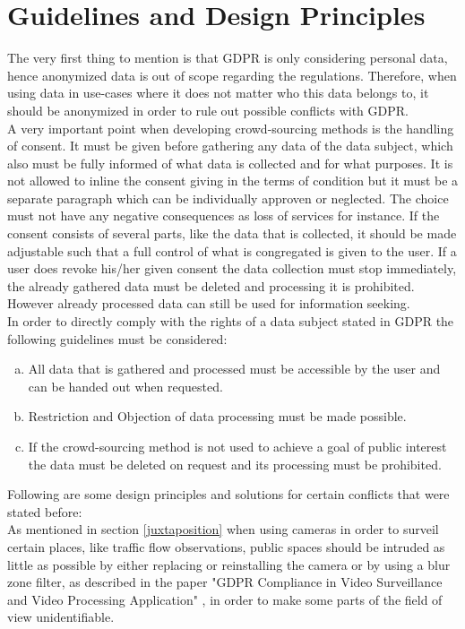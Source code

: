 \documentclass[a4paper,12pt]{report}
\begin{document}
	\section{Guidelines and Design Principles}
	\startsection
		The very first thing to mention is that GDPR is only considering personal data, hence anonymized data is out of scope regarding the regulations. Therefore, when using data in use-cases where it does not matter who this data belongs to, it should be anonymized in order to rule out possible conflicts with GDPR. \\
		A very important point when developing crowd-sourcing methods is the handling of consent. It must be given before gathering any data of the data subject, which also must be fully informed of what data is collected and for what purposes. It is not allowed to inline the consent giving in the terms of condition but it must be a separate paragraph which can be individually approven or neglected. The choice must not have any negative consequences as loss of services for instance. If the consent consists of several parts, like the data that is collected, it should be made adjustable such that a full control of what is congregated is given to the user. If a user does revoke his/her given consent the data collection must stop immediately, the already gathered data must be deleted and processing it is prohibited. However already processed data can still be used for information seeking. \\
		In order to directly comply with the rights of a data subject stated in GDPR the following guidelines must be considered:
		\begin{enumerate}[(a)]
			\item All data that is gathered and processed must be accessible by the user and can be handed out when requested.
			\item Restriction and Objection of data processing must be made possible.
			\item If the crowd-sourcing method is not used to achieve a goal of public interest the data must be deleted on request and its processing must be prohibited.
		\end{enumerate}
		Following are some design principles and solutions for certain conflicts that were stated before: \\	
		As mentioned in section \ref{juxtaposition} when using cameras in order to surveil certain places, like traffic flow observations, public spaces should be intruded as little as possible by either replacing or reinstalling the camera or by using a blur zone filter, as described in the paper "GDPR Compliance in Video Surveillance and Video Processing Application" \cite{GDPRandSurveillanceCameras}, in order to make some parts of the field of view unidentifiable. \\
\end{document}
